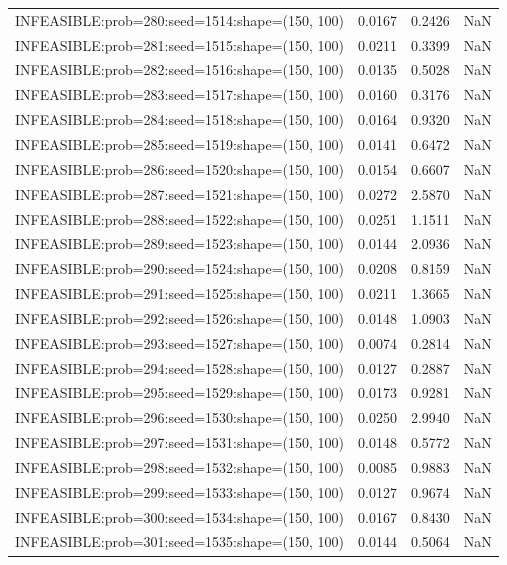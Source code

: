 \begin{longtable}{lccc}
INFEASIBLE:prob=280:seed=1514:shape=(150, 100) &   0.0167 &  0.2426 &    NaN \\
INFEASIBLE:prob=281:seed=1515:shape=(150, 100) &   0.0211 &  0.3399 &    NaN \\
INFEASIBLE:prob=282:seed=1516:shape=(150, 100) &   0.0135 &  0.5028 &    NaN \\
INFEASIBLE:prob=283:seed=1517:shape=(150, 100) &   0.0160 &  0.3176 &    NaN \\
INFEASIBLE:prob=284:seed=1518:shape=(150, 100) &   0.0164 &  0.9320 &    NaN \\
INFEASIBLE:prob=285:seed=1519:shape=(150, 100) &   0.0141 &  0.6472 &    NaN \\
INFEASIBLE:prob=286:seed=1520:shape=(150, 100) &   0.0154 &  0.6607 &    NaN \\
INFEASIBLE:prob=287:seed=1521:shape=(150, 100) &   0.0272 &  2.5870 &    NaN \\
INFEASIBLE:prob=288:seed=1522:shape=(150, 100) &   0.0251 &  1.1511 &    NaN \\
INFEASIBLE:prob=289:seed=1523:shape=(150, 100) &   0.0144 &  2.0936 &    NaN \\
INFEASIBLE:prob=290:seed=1524:shape=(150, 100) &   0.0208 &  0.8159 &    NaN \\
INFEASIBLE:prob=291:seed=1525:shape=(150, 100) &   0.0211 &  1.3665 &    NaN \\
INFEASIBLE:prob=292:seed=1526:shape=(150, 100) &   0.0148 &  1.0903 &    NaN \\
INFEASIBLE:prob=293:seed=1527:shape=(150, 100) &   0.0074 &  0.2814 &    NaN \\
INFEASIBLE:prob=294:seed=1528:shape=(150, 100) &   0.0127 &  0.2887 &    NaN \\
INFEASIBLE:prob=295:seed=1529:shape=(150, 100) &   0.0173 &  0.9281 &    NaN \\
INFEASIBLE:prob=296:seed=1530:shape=(150, 100) &   0.0250 &  2.9940 &    NaN \\
INFEASIBLE:prob=297:seed=1531:shape=(150, 100) &   0.0148 &  0.5772 &    NaN \\
INFEASIBLE:prob=298:seed=1532:shape=(150, 100) &   0.0085 &  0.9883 &    NaN \\
INFEASIBLE:prob=299:seed=1533:shape=(150, 100) &   0.0127 &  0.9674 &    NaN \\
INFEASIBLE:prob=300:seed=1534:shape=(150, 100) &   0.0167 &  0.8430 &    NaN \\
INFEASIBLE:prob=301:seed=1535:shape=(150, 100) &   0.0144 &  0.5064 &    NaN \\

\end{longtable}
